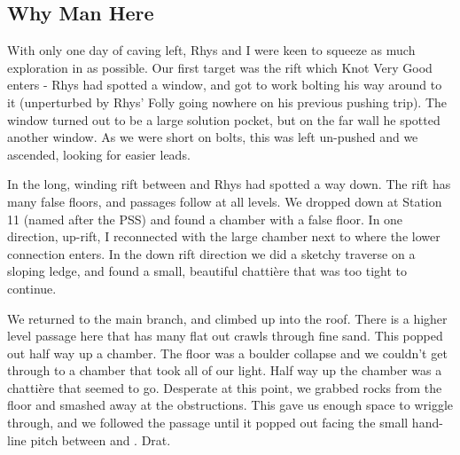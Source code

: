  
\subsection{Why Man Here}
 
 \begin{marginfigure}
 \end{marginfigure}
 
With only one day of caving left, Rhys and I were keen to squeeze as much exploration in as possible. Our first target was the rift which Knot Very Good enters - Rhys had spotted a window, and got to work bolting his way around to it (unperturbed by Rhys’ Folly going nowhere on his previous pushing trip). The window turned out to be a large solution pocket, but on the far wall he spotted another window. As we were short on bolts, this was left un-pushed and we ascended, looking for easier leads.
 
In the long, winding rift between  and  Rhys had spotted a way down. The rift has many false floors, and passages follow at all levels. We dropped down at Station 11 (named after the PSS) and found a chamber with a false floor. In one direction, up-rift, I reconnected with the large chamber next to  where the lower  connection enters. In the down rift direction we did a sketchy traverse on a sloping ledge, and found a small, beautiful chattière that was too tight to continue.
 
We returned to the main branch, and climbed up into the roof. There is a higher level passage here that has many flat out crawls through fine sand. This popped out half way up a chamber. The floor was a boulder collapse and we couldn’t get through to a chamber that took all of our light. Half way up the chamber was a chattière that seemed to go. Desperate at this point, we grabbed rocks from the floor and smashed away at the obstructions. This gave us enough space to wriggle through, and we followed the passage until it popped out facing the small hand-line pitch between  and . Drat.
 
